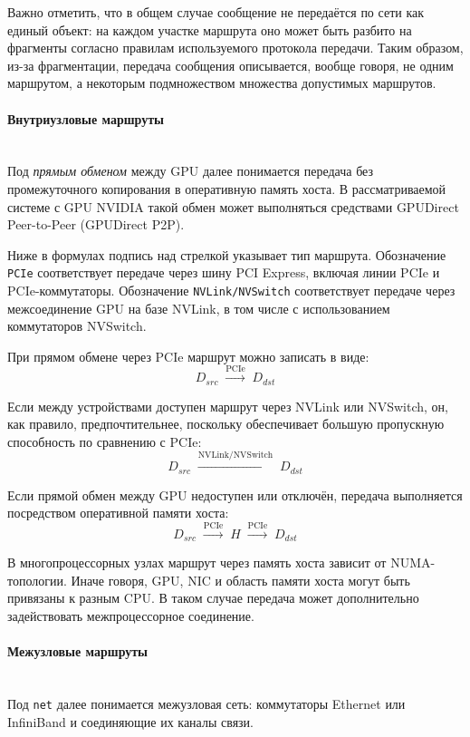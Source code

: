 \documentclass[a4paper,14pt]{extarticle}
\newcommand{\route}[1]{\mathrel{\overset{\text{#1}}{\longrightarrow}}}
\begin{document}
Важно отметить, что в общем случае сообщение не передаётся по сети как единый объект: на каждом участке маршрута оно может быть разбито на фрагменты согласно правилам используемого протокола передачи. Таким образом, из-за фрагментации, передача сообщения описывается, вообще говоря, не одним маршрутом, а некоторым подмножеством множества допустимых маршрутов.

\paragraph{Внутриузловые маршруты}\mbox{}\\
\indent Под \emph{прямым обменом} между GPU далее понимается передача без промежуточного копирования в оперативную память хоста. В рассматриваемой системе с GPU NVIDIA такой обмен может выполняться средствами GPUDirect Peer-to-Peer (GPUDirect P2P).

Ниже в формулах подпись над стрелкой указывает тип маршрута. Обозначение \texttt{PCIe} соответствует передаче через шину PCI Express, включая линии PCIe и PCIe-коммутаторы. Обозначение \texttt{NVLink/NVSwitch} соответствует передаче через межсоединение GPU на базе NVLink, в том числе с использованием коммутаторов NVSwitch.

При прямом обмене через PCIe маршрут можно записать в виде:
\[
	D_{src} \;\route{PCIe}\; D_{dst}
\]

Если между устройствами доступен маршрут через NVLink или NVSwitch, он, как правило, предпочтительнее, поскольку обеспечивает большую пропускную способность по сравнению с PCIe:
\[
	D_{src} \;\route{NVLink/NVSwitch}\; D_{dst}
\]

Если прямой обмен между GPU недоступен или отключён, передача выполняется посредством оперативной памяти хоста:
\[
	D_{src} \;\route{PCIe}\; H
	\;\route{PCIe}\; D_{dst}
\]

В многопроцессорных узлах маршрут через память хоста зависит от NUMA-топологии. Иначе говоря, GPU, NIC и область памяти хоста могут быть привязаны к разным CPU. В таком случае передача может дополнительно задействовать межпроцессорное соединение.

\paragraph{Межузловые маршруты}\mbox{}\\
\indent Под \texttt{net} далее понимается межузловая сеть: коммутаторы Ethernet или InfiniBand и соединяющие их каналы связи.
\end{document}
